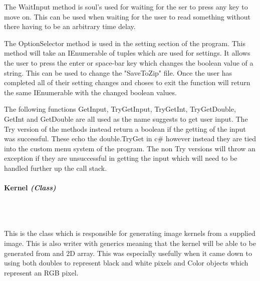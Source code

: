 \begin{FlushLeft}
    The WaitInput method is soul's used for waiting for the ser to press any key to move on. This can be used when waiting for the user to read something without there having to be an arbitrary time delay. \\ \bk

    The OptionSelector method is used in the setting section of the program. This method will take an IEnumerable of tuples which are used for settings. It allows the user to press the enter or space-bar key which changes the boolean value of a string. This can be used to change the "SaveToZip" file. Once the user has completed all of their setting changes and choses to exit the function will return the same IEnumerable with the changed boolean values. \\ \bk

    The following functions GetInput, TryGetInput, TryGetInt, TryGetDouble, GetInt and GetDouble are all used as the name suggests to get user input. The Try version of the methods instead return a boolean if the getting of the input was successful. These echo the double.TryGet in c# however instead they are tied into the custom menu system of the program. The non Try versions will throw an exception if they are unsuccessful in getting the input which will need to be handled further up the call stack.\\ 

    \bk

    \pagebreak
    \paragraph{Kernel \textit{(Class)}} \mbox{} \\

    \begin{figure}[H]
        \centering
    \end{figure}\\

    This is the class which is responsible for generating image kernels from a supplied image. This is also writer with generics meaning that the kernel will be able to be generated from and 2D array. This was especially usefully when it came down to using both doubles to represent black and white pixels and Color objects which represent an RGB pixel. \\ \bk


\end{FlushLeft}
